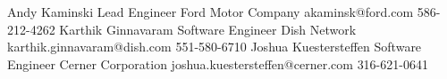 %
%
%


\begin{referees}
		{Andy Kaminski}
		{Lead Engineer}
		{Ford Motor Company}
		{akaminsk@ford.com}
		{586-212-4262}
		{Karthik Ginnavaram}
		{Software Engineer}
		{Dish Network}
		{karthik.ginnavaram@dish.com}
		{551-580-6710}
		{Joshua Kuestersteffen}
		{Software Engineer}
		{Cerner Corporation}
		{joshua.kuestersteffen@cerner.com}
		{316-621-0641}


\end{referees}